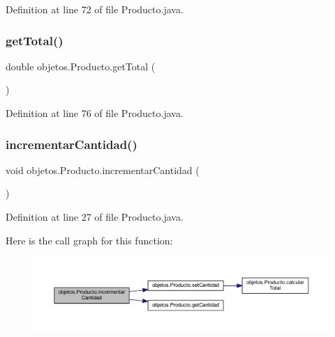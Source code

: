 Definition at line 72 of file Producto.\+java.

\mbox{\label{classobjetos_1_1_producto_adbea45187ac465c2a7a2993f4739cb40}} 
\subsubsection{\texorpdfstring{get\+Total()}{getTotal()}}
{\footnotesize\ttfamily double objetos.\+Producto.\+get\+Total (\begin{DoxyParamCaption}{ }\end{DoxyParamCaption})}



Definition at line 76 of file Producto.\+java.

\mbox{\label{classobjetos_1_1_producto_afb28a08655f512fd3048a20281cbba44}} 
\subsubsection{\texorpdfstring{incrementar\+Cantidad()}{incrementarCantidad()}}
{\footnotesize\ttfamily void objetos.\+Producto.\+incrementar\+Cantidad (\begin{DoxyParamCaption}{ }\end{DoxyParamCaption})}



Definition at line 27 of file Producto.\+java.

Here is the call graph for this function\+:
\nopagebreak
\begin{figure}[H]
\begin{center}
\leavevmode
\includegraphics[width=350pt]{classobjetos_1_1_producto_afb28a08655f512fd3048a20281cbba44_cgraph}
\end{center}
\end{figure}
\mbox{\label{classobjetos_1_1_producto_ae14dcc26bdc312a512627177d4e7e442}} 
